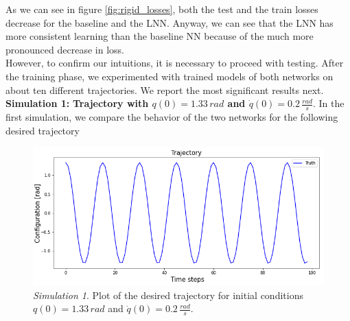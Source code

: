 \documentclass[a4paper]{article}
\begin{document}
As we can see in figure \ref{fig:rigid_losses}, both the test and the train losses decrease for the baseline and the LNN. Anyway, we can see that the LNN has more consistent learning than the baseline NN because of the much more pronounced decrease in loss.\\ However, to confirm our intuitions, it is necessary to proceed with testing. After the training phase, we experimented with trained models of both networks on about ten different trajectories. We report the most significant results next.\\

\textbf{Simulation 1:} \textbf{Trajectory with $q(0)=1.33\, rad$ and $\dot{q}(0)=0.2\, \frac{rad}{s}.$}
In the first simulation, we compare the behavior of the two networks for the following desired trajectory

\begin{figure}
    \centering
    \includegraphics[scale=0.7]{img/final_results/rigid/76deg_02rads/traj_76_02.png}
    \caption{\textit{Simulation 1}. Plot of the desired trajectory for initial conditions $q(0)=1.33\, rad$ and $\dot{q}(0)=0.2\, \frac{rad}{s}.$}
    \label{fig:desired_rigid_76degrees_02rads}
\end{figure}
\end{document}

